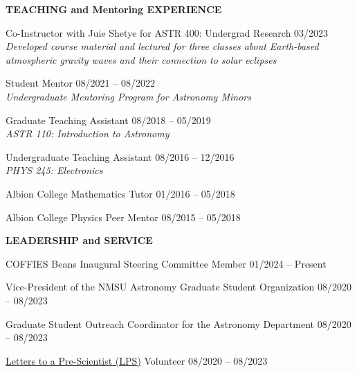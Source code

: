 \documentclass{resume} %
\begin{document}
\vspace{-0.1in}
\begin{rSection}{\textbf{TEACHING and Mentoring EXPERIENCE}}
\vspace{0.02in}

{Co-Instructor with Juie Shetye for ASTR 400: Undergrad Research} \hfill{03/2023} \\
{\emph{Developed course material and lectured for three classes about Earth-based \\ atmospheric gravity waves and their connection to solar eclipses}}


{Student Mentor} \hfill{08/2021 -- 08/2022} \\ 
{\emph{Undergraduate Mentoring Program for Astronomy Minors}}

{Graduate Teaching Assistant} \hfill{08/2018 -- 05/2019} \\
{\emph{ASTR 110: Introduction to Astronomy}}

{Undergraduate Teaching Assistant} \hfill{08/2016 -- 12/2016} \\
{\emph{PHYS 245: Electronics}}

{Albion College Mathematics Tutor}  \hfill{ 01/2016 -- 05/2018}

{Albion College Physics Peer Mentor}  \hfill{08/2015 -- 05/2018}
\end{rSection}



\vspace{-0.1in}
\begin{rSection}{\textbf{LEADERSHIP and SERVICE}}
\vspace{0.02in}

{COFFIES Beans Inaugural Steering Committee Member \hfill{01/2024 -- Present}} 

{Vice-President of the NMSU Astronomy Graduate Student Organization \hfill{08/2020 -- 08/2023}} 

{Graduate Student Outreach Coordinator for the Astronomy Department} \hfill{08/2020 -- 08/2023}

{\href{https://prescientist.org/}{Letters to a Pre-Scientist (LPS)} Volunteer} \hfill{08/2020 -- 08/2023}
\end{rSection} 
\end{document}
